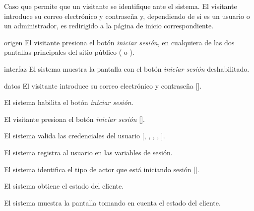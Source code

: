 %
%

{
  Caso que permite que un visitante se identifique ante el sistema. El
  visitante introduce su correo electrónico y contraseña y, dependiendo de
  si es un usuario o un administrador, es redirigido a la página de
  inicio correspondiente.

  \begin{trayectoriaPrincipal}

    \item[origen] El visitante presiona el botón \textit{iniciar sesión}, en
      cualquiera de las dos pantallas principales del sitio público
      ( o ).

    \item[interfaz] El sistema muestra la pantalla
       con el botón \textit{iniciar sesión}
      deshabilitado.

    \item[datos] El visitante introduce su correo electrónico y contraseña
      [].

    \item El sistema habilita el botón \textit{iniciar sesión}.

    \item El visitante presiona el botón \textit{iniciar sesión}
      [].

    \item El sistema valida las credenciales del usuario
      [,
      ,
      ,
      ,
      ].

    \item El sistema registra al usuario en las variables de sesión.

    \item El sistema identifica el tipo de actor que está iniciando
      sesión [].

    \item El sistema obtiene el estado del cliente.

    \item El sistema muestra la pantalla
       tomando en cuenta el estado
      del cliente.


\end{trayectoriaPrincipal}}
